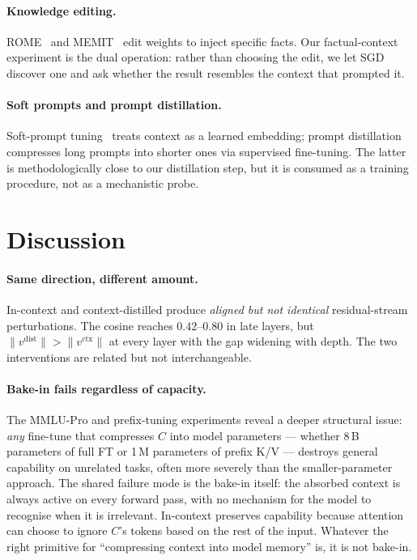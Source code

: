 \documentclass[letterpaper]{article} %
\begin{document}
\paragraph{Knowledge editing.}
ROME~\citep{meng2022rome} and MEMIT~\citep{meng2023memit} edit weights to
inject specific facts. Our factual-context experiment is the dual
operation: rather than choosing the edit, we let SGD discover one and
ask whether the result resembles the context that prompted it.

\paragraph{Soft prompts and prompt distillation.}
Soft-prompt tuning~\citep{lester2021power} treats context as a learned
embedding; prompt distillation~\citep{askell2021general} compresses long
prompts into shorter ones via supervised fine-tuning. The latter is
methodologically close to our distillation step, but it is consumed as a
training procedure, not as a mechanistic probe.

\section{Discussion}
\label{sec:discussion}

\paragraph{Same direction, different amount.}
In-context and context-distilled produce \emph{aligned but not
identical} residual-stream perturbations. The cosine reaches
$0.42$--$0.80$ in late layers, but $\|v^\text{dist}\| > \|v^\text{ctx}\|$
at every layer with the gap widening with depth. The two interventions
are related but not interchangeable.

\paragraph{Bake-in fails regardless of capacity.}
The MMLU-Pro and prefix-tuning experiments reveal a deeper structural
issue: \emph{any} fine-tune that compresses $C$ into model parameters
--- whether 8\,B parameters of full FT or 1\,M parameters of prefix
K/V --- destroys general capability on unrelated tasks, often more
severely than the smaller-parameter approach. The shared failure
mode is the bake-in itself: the absorbed context is always active on
every forward pass, with no mechanism for the model to recognise
when it is irrelevant. In-context preserves capability because
attention can choose to ignore $C$'s tokens based on the rest of the
input. Whatever the right primitive for ``compressing context into
model memory'' is, it is not bake-in.
\end{document}
